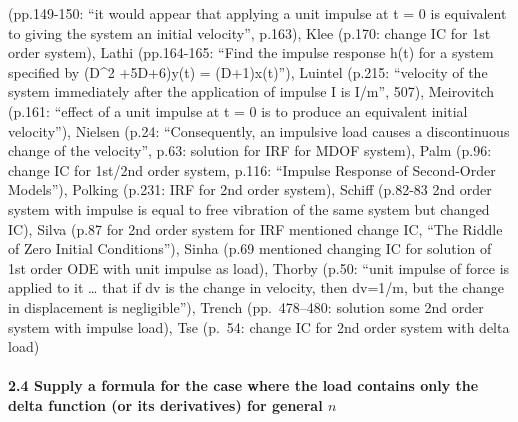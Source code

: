 \documentclass[
  11pt,
]{article}
\begin{document}
(pp.149-150: ``it would appear that applying a unit impulse at t = 0 is
equivalent to giving the system an initial velocity'', p.163), Klee
(p.170: change IC for 1st order system), Lathi (pp.164-165: ``Find the
impulse response h(t) for a system specified by (D\^{}2 +5D+6)y(t) =
(D+1)x(t)''), Luintel (p.215: ``velocity of the system immediately after
the application of impulse I is I/m'', 507), Meirovitch (p.161: ``effect
of a unit impulse at t = 0 is to produce an equivalent initial
velocity''), Nielsen (p.24: ``Consequently, an impulsive load causes a
discontinuous change of the velocity'', p.63: solution for IRF for MDOF
system), Palm (p.96: change IC for 1st/2nd order system, p.116:
``Impulse Response of Second-Order Models''), Polking (p.231: IRF for
2nd order system), Schiff (p.82-83 2nd order system with impulse is
equal to free vibration of the same system but changed IC), Silva (p.87
for 2nd order system for IRF mentioned change IC, ``The Riddle of Zero
Initial Conditions''), Sinha (p.69 mentioned changing IC for solution of
1st order ODE with unit impulse as load), Thorby (p.50: ``unit impulse
of force is applied to it \ldots{} that if dv is the change in velocity,
then dv=1/m, but the change in displacement is negligible''), Trench
(pp.~478--480: solution some 2nd order system with impulse load), Tse
(p.~54: change IC for 2nd order system with delta load)

\hypertarget{supply-a-formula-for-the-case-where-the-load-contains-only-the-delta-function-or-its-derivatives-for-general-n}{%
\paragraph{\texorpdfstring{2.4 Supply a formula for the case where the
load contains only the delta function (or its derivatives) for general
\(n\)}{2.4 Supply a formula for the case where the load contains only the delta function (or its derivatives) for general n}}\label{supply-a-formula-for-the-case-where-the-load-contains-only-the-delta-function-or-its-derivatives-for-general-n}}
\end{document}
